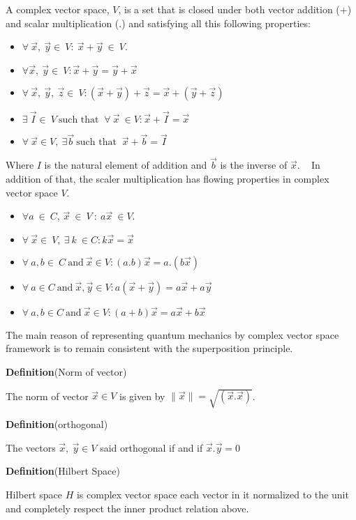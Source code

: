 A complex vector space, $V$, is a set that is closed under both vector addition
($ +$) and scalar multiplication (.) and satisfying all this following properties:
\begin{itemize}
\item $\forall~ \vec{x},~\vec{y} \in ~ V : ~\vec{x}+\vec{y} ~\in~ V $.
\item $\forall \vec{x},~\vec{y} \in ~ V : \vec{x}+\vec{y}=\vec{y}+\vec{x}$
\item $\forall~ \vec{x},~\vec{y}, ~\vec{z} \in ~ V:\left(\vec{x}+\vec{y}\right)+\vec{z}=\vec{x}+\left(\vec{y}+\vec{z}\right)$
\item $\exists ~\vec{I} \in ~V~ \text{such that }~  \forall~ \vec{x} ~\in  V: \vec{x}+\vec{I}=\vec{x}$
\item $\forall ~\vec{x} \in V,~ \exists \vec{b} ~ \text{such that }  ~\vec{x}+\vec{b}= \vec{I}$
\end{itemize}
Where $I$ is the natural element of addition and $\vec{b}$ is the inverse of $\vec{x}$. ~
In addition  of that, the scaler  multiplication has flowing properties in complex vector space $V$.
\begin{itemize}
\item $\forall a~\in ~C$, $\vec{x}~\in ~V~ :~ a\vec{x}~ \in V$.
\item $\forall ~\vec{x} \in ~V,~ \exists~ k ~\in C :k\vec{x}=\vec{x}$
\item $\forall ~ a,b \in ~C ~\text{and} ~ \vec{x}\in V :\left(a.b\right) \vec{x}=a.\left(b \vec{x}\right)$
\item $\forall ~ a \in C ~\text{and} ~ \vec{x}, \vec{y}\in V:a\left(\vec{x}+\vec{y}\right)=a\vec{x}+a\vec{y}$
\item $\forall ~ a,b \in C ~\text{and} ~ \vec{x}\in V:\left(a+b\right)\vec{x}=a\vec{x}+b\vec{x}$
\end{itemize}
The main reason of representing quantum mechanics by complex  vector space framework is to remain consistent with the superposition principle.

\textbf{Definition}{(Norm of vector)}

The norm of vector $\vec{x} \in V$ is given by $\parallel \vec{x}\parallel=\sqrt{\left(\vec{x}.\vec{x}\right)}$.

\textbf{Definition}{(orthogonal)}

The vectors $\vec{x},~ \vec{y} \in V$ said orthogonal if and if $\vec{x}.\vec{y}=0$

\textbf{Definition}{(Hilbert Space)}

Hilbert space $H$ is complex vector space  each vector in it normalized to the unit and completely  respect the inner product relation above\citep{book:4365}.

